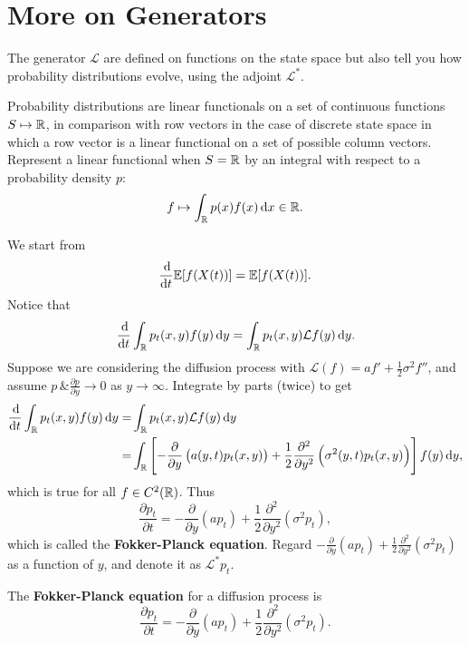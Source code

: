 \section{More on Generators}

The generator $\mathcal{L}$ are defined on functions on the state space but also tell you how probability distributions evolve, using the adjoint $\mathcal{L}^*$. 

Probability distributions are linear functionals on a set of continuous functions $S \mapsto \mathbb{R}$, in comparison with row vectors in the case of discrete state space in which a row vector is a linear functional on a set of possible column vectors. Represent a linear functional when $S = \mathbb{R}$ by an integral with respect to a probability density $p$:
\begin{equation*}
    f \mapsto \int_{\mbb{R}} p(x) f(x) \dif x \in \mbb{R}.
\end{equation*}

We start from 
\begin{equation*}
    \frac{\dif}{\dif t} \E [f(X(t))] = \E [f(X(t))].
\end{equation*}
Notice that 
\begin{equation*}
    \frac{\dif}{\dif t} \int_\mbb{R} p_t(x, y) f(y) \dif y =  \int_\mbb{R} p_t(x, y) \mathcal{L}f(y) \dif y.
\end{equation*}
Suppose we are considering the diffusion process with $\mathcal{L}(f) = af'+ \frac{1}{2} \sigma^2 f''$, and assume $p \, \& \frac{\partial p}{\partial y} \to 0$ as $y \to \infty$. Integrate by parts (twice) to get 
\begin{align*}
    \frac{\dif}{\dif t} \int_\mbb{R} p_t(x, y) f(y) \dif y = & \int_\mbb{R} p_t(x, y) \mathcal{L}f(y) \dif y \\ 
    = & \int_\mbb{R} \left[ - \frac{\partial}{\partial y} \left(a(y, t) p_t(x, y)\right) + \frac{1}{2} \frac{\partial^2}{\partial y^2} \left( \sigma^2(y, t) p_t(x, y) \right) \right] f(y) \dif y,
\end{align*}
which  is true for all $f \in C^2(\mathbb{R})$. Thus 
\begin{equation*}
    \frac{\partial p_t}{\partial t} = - \frac{\partial }{\partial y} \left(a p_t \right) + \frac{1}{2} \frac{\partial^2}{\partial y^2} \left(\sigma^2 p_t \right), 
\end{equation*}
which is called the \textbf{Fokker-Planck equation}. Regard $- \frac{\partial }{\partial y} \left(a p_t \right) + \frac{1}{2} \frac{\partial^2}{\partial y^2} \left(\sigma^2 p_t \right)$ as a function of $y$, and denote it as $\mathcal{L}^* p_t$.
\begin{definition}
    The \textbf{Fokker-Planck equation} for a diffusion process is 
    \begin{equation*}
        \frac{\partial p_t}{\partial t} = - \frac{\partial }{\partial y} \left(a p_t \right) + \frac{1}{2} \frac{\partial^2}{\partial y^2} \left(\sigma^2 p_t \right).
    \end{equation*}
\end{definition}

